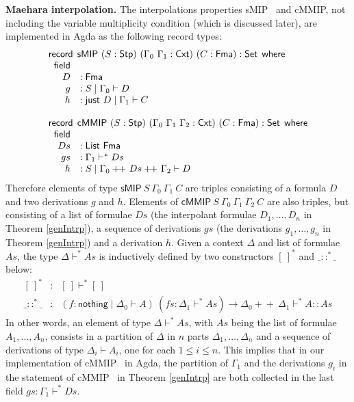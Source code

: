 \documentclass[sn-mathphys-num]{sn-jnl}%
\newcommand{\GG}{\Gamma}
\newcommand{\sMIP}{\textsf{sMIP}}
\newcommand{\cMMIP}{\textsf{cMMIP}}
\newcommand{\List}{\mathsf{List}}
\newcommand{\nothing}{\mathsf{nothing}}
\newcommand{\just}{\mathsf{just}}
\newcommand{\append}{+\!\!+}
\newcommand{\Fma}{\mathsf{Fma}}
\newcommand{\where}{\mathsf{where}}
\newcommand{\Set}{\mathsf{Set}}
\newcommand{\record}{\mathsf{record}}
\newcommand{\field}{\mathsf{field}}
\newcommand{\Stp}{\mathsf{Stp}}
\newcommand{\Cxt}{\mathsf{Cxt}}
\theoremstyle{thmstyleone}%
\theoremstyle{thmstyletwo}%
\theoremstyle{thmstylethree}%
\begin{document}
\noindent\textbf{Maehara interpolation.}
The interpolations properties \sMIP~ and \cMMIP, not including the variable multiplicity condition (which is discussed later), are implemented in Agda as the following record types:
\[
\begin{array}{rl}
  \multicolumn{2}{l}{\record \:\:  \sMIP ~(S : \Stp) ~(\GG_0 ~\GG_1 : \Cxt) ~(C : \Fma) : \Set \:\: \where} \\
  \;\; \field \\
  \;\; D &: \Fma \\
  \;\; g &: S \mid \GG_0 \vdash D \\
  \;\; h &: \just ~D \mid \GG_1 \vdash C \\ \\
  \multicolumn{2}{l}{\record \:\:  \cMMIP ~(S : \Stp) ~(\GG_0 ~\GG_1 ~ \GG_2: \Cxt) ~(C : \Fma) : \Set \:\: \where} \\
  \;\; \field \\
  \;\; Ds &: \List ~\Fma \\
  \;\; gs &: \GG_1 \vdash^* Ds \\
  \;\; h &: S \mid \GG_0 \append ~Ds \append ~\GG_2 \vdash D
\end{array}
\]
Therefore elements of type $\sMIP ~S ~\GG_0 ~\GG_1 ~C$ are triples consisting of a formula $D$ and two derivations $g$ and $h$.
Elements of $\cMMIP ~S ~\GG_0 ~\GG_1 ~\GG_2 ~C$ are also triples, but consisting of a list of formulae $Ds$ (the interpolant formulae $D_1,\dots,D_n$ in Theorem \ref{genIntrp}), a sequence of derivations $gs$ (the derivations $g_1,\dots,g_n$ in Theorem \ref{genIntrp}) and a derivation $h$.
Given a context $\Delta$ and list of formulae $As$, the type $\Delta \vdash^* As$ is inductively defined by two constructors $[~]^*$ and $\_ ::^*\!\!\!\_$ below:
\[
\begin{array}{rcl}
  [~]^* &:& [~] \vdash^* [~]\\
  \_ ::^*\!\!\!\_ &:&
  (f : \nothing \mid \Delta_0 \vdash A)
  ~ (fs : \Delta_1 \vdash^* As)
  \to \Delta_0 \append ~\Delta_1 \vdash^* A :: As
\end{array}
\]
In other words, an element of type $\Delta \vdash^* As$, with $As$ being the list of formulae $A_1,\dots,A_n$, consists in a partition of $\Delta$ in $n$ parts $\Delta_1,\dots,\Delta_n$ and a sequence of derivations of type $\Delta_i \vdash A_i$, one for each $1 \le i \le n$.
This implies that in our implementation of \cMMIP~ in Agda, the partition of $\GG_1$ and the derivations $g_i$ in the statement of \cMMIP~ in Theorem \ref{genIntrp} are both collected in the last field $gs : \GG_1 \vdash^* Ds$.
\end{document}
